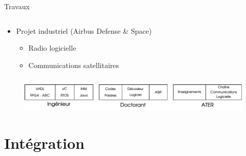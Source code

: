 \documentclass[t,compress,mathserif,12pt,xcolor=dvipsnames]{beamer}
\begin{document}
\begin{frame}[t]{Travaux}
 \begin{minipage}[t][5.0cm][t]{\textwidth}
    \begin{columns}[T]
      \begin{column}{0.63\textwidth}
          \begin{itemize}
            \item Projet industriel (Airbus Defense \& Space)
            \begin{itemize}
              \item Radio logicielle
              \item Communications satellitaires
            \end{itemize}
          \end{itemize}
      \end{column}
      \begin{column}{0.04\textwidth}

      \end{column}
      \begin{column}{0.33\textwidth}
      \end{column}
    \end{columns}
  \end{minipage}
  \begin{figure}[htp]
    \centering
    \includegraphics[width=\textwidth]{fig/frise9}
  \end{figure}
\end{frame}

\section{Intégration}
\end{document}

